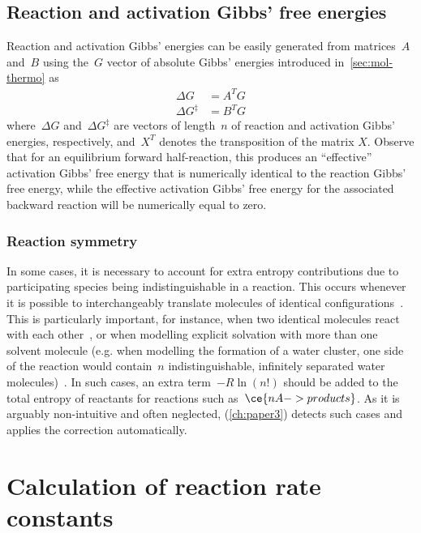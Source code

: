 \subsection{Reaction and activation Gibbs' free energies}%
\label{sec:reaction-energies}

Reaction and activation Gibbs' energies can be easily generated from matrices~$A$ and~$B$ using
the~$G$ vector of absolute Gibbs' energies introduced in~\cref{sec:mol-thermo} as
%
\begin{equation}
	\begin{split}
		\Delta G &= A^T G \\
		\Delta G^\ddagger &= B^T G
	\end{split}
\end{equation}
%
where~$\Delta G$ and~$\Delta G^\ddagger$ are vectors of length~$n$ of reaction and activation Gibbs' energies,
respectively,
and~$X^T$ denotes the transposition of the matrix $X$.
Observe that for an equilibrium forward half-reaction,
this produces an ``effective'' activation Gibbs' free energy that is numerically identical to the reaction Gibbs' free energy,
while the effective activation Gibbs' free energy for the associated backward reaction will be numerically equal to zero.

\subsubsection{Reaction symmetry}

In some cases,
it is necessary to account for extra entropy contributions due to participating species being indistinguishable in a reaction.
This occurs whenever it is possible to interchangeably translate molecules of identical configurations~\cite{Fern_ndez_Ramos_2007,Gilson_2010}.
This is particularly important,
for instance,
when two identical molecules react with each other~\cite{Fern_ndez_Ramos_2007,Gilson_2010},
or when modelling explicit solvation with more than one solvent molecule (e.g.
when modelling the formation of a water cluster,
one side of the reaction would contain~$n$ indistinguishable,
infinitely separated water molecules)~\cite{Jensen_2015}.
In such cases,
an extra term~$-R \ln{\left( n! \right)}$ should be added to the total entropy of reactants for reactions such as~$\ce{n A -> products}$.
As it is arguably non-intuitive and often neglected,
\overreact{} (\cref{ch:paper3}) detects such cases and applies the correction automatically.

\section{Calculation of reaction rate constants}%
\label{sec:rates}

